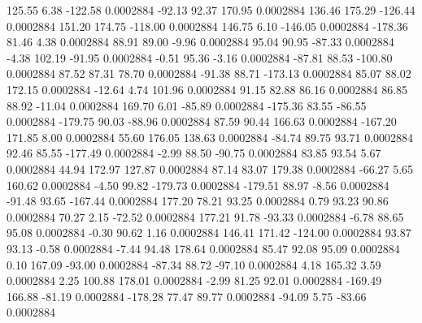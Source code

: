       125.55        6.38     -122.58     0.0002884
      -92.13       92.37      170.95     0.0002884
      136.46      175.29     -126.44     0.0002884
      151.20      174.75     -118.00     0.0002884
      146.75        6.10     -146.05     0.0002884
     -178.36       81.46        4.38     0.0002884
       88.91       89.00       -9.96     0.0002884
       95.04       90.95      -87.33     0.0002884
       -4.38      102.19      -91.95     0.0002884
       -0.51       95.36       -3.16     0.0002884
      -87.81       88.53     -100.80     0.0002884
       87.52       87.31       78.70     0.0002884
      -91.38       88.71     -173.13     0.0002884
       85.07       88.02      172.15     0.0002884
      -12.64        4.74      101.96     0.0002884
       91.15       82.88       86.16     0.0002884
       86.85       88.92      -11.04     0.0002884
      169.70        6.01      -85.89     0.0002884
     -175.36       83.55      -86.55     0.0002884
     -179.75       90.03      -88.96     0.0002884
       87.59       90.44      166.63     0.0002884
     -167.20      171.85        8.00     0.0002884
       55.60      176.05      138.63     0.0002884
      -84.74       89.75       93.71     0.0002884
       92.46       85.55     -177.49     0.0002884
       -2.99       88.50      -90.75     0.0002884
       83.85       93.54        5.67     0.0002884
       44.94      172.97      127.87     0.0002884
       87.14       83.07      179.38     0.0002884
      -66.27        5.65      160.62     0.0002884
       -4.50       99.82     -179.73     0.0002884
     -179.51       88.97       -8.56     0.0002884
      -91.48       93.65     -167.44     0.0002884
      177.20       78.21       93.25     0.0002884
        0.79       93.23       90.86     0.0002884
       70.27        2.15      -72.52     0.0002884
      177.21       91.78      -93.33     0.0002884
       -6.78       88.65       95.08     0.0002884
       -0.30       90.62        1.16     0.0002884
      146.41      171.42     -124.00     0.0002884
       93.87       93.13       -0.58     0.0002884
       -7.44       94.48      178.64     0.0002884
       85.47       92.08       95.09     0.0002884
        0.10      167.09      -93.00     0.0002884
      -87.34       88.72      -97.10     0.0002884
        4.18      165.32        3.59     0.0002884
        2.25      100.88      178.01     0.0002884
       -2.99       81.25       92.01     0.0002884
     -169.49      166.88      -81.19     0.0002884
     -178.28       77.47       89.77     0.0002884
      -94.09        5.75      -83.66     0.0002884
